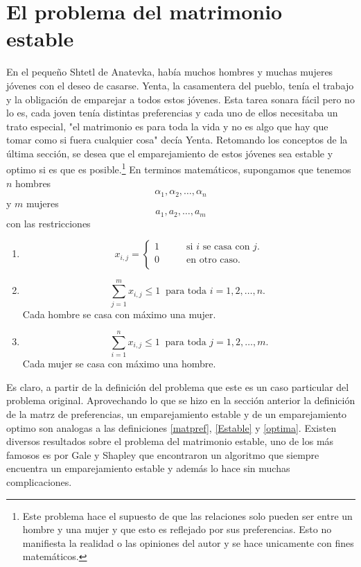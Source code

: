 \section{El problema del matrimonio estable}
En el pequeño Shtetl de Anatevka, había muchos hombres y muchas mujeres jóvenes con el deseo de casarse. Yenta, la casamentera del pueblo, tenía el trabajo y la obligación de emparejar a todos estos jóvenes. Esta tarea sonara fácil pero no lo es, cada joven tenía distintas preferencias y cada uno de ellos necesitaba un trato especial, "el matrimonio es para toda la vida y no es algo que hay que tomar como si fuera cualquier cosa" decía Yenta. Retomando los conceptos de la última sección, se desea que el emparejamiento de estos jóvenes sea estable y optimo si es que es posible.\footnote{Este problema hace el supuesto de que las relaciones solo pueden ser entre un hombre y una mujer y que esto es reflejado por sus preferencias. Esto no manifiesta la realidad o las opiniones del autor y se hace unicamente con fines matemáticos.}
En terminos matemáticos, supongamos que tenemos $n$ hombres $$\alpha_1,\alpha_2,\ldots,\alpha_n$$ y $m$ mujeres $$a_1, a_2,\ldots,a_m$$ con las restricciones
\begin{enumerate}
\item \begin{equation} \label{1r1}
x_{i,j}= 
\begin{cases}
1 & \qquad \text{si $i$ se casa con $j$.} \\
0 &\qquad\text{en otro caso.}\ \\ 
\end{cases} \end{equation}
\item \begin{equation} \label{1r2}
\sum_{j=1}^{m}x_{i,j} \leq1 \ \text{ para toda $i=1,2,\ldots,n$. }
\end{equation} Cada hombre se casa con máximo una mujer. 
\item \begin{equation} \label{1r3}
\sum_{i=1}^{n} x_{i,j} \leq 1\ \text{ para toda $j=1,2,\dots,m$.} 
\end{equation}
Cada mujer se casa con máximo una hombre. 
\end{enumerate}

Es claro, a partir de la definición del problema que este es un caso particular del problema original. Aprovechando lo que se hizo en la sección anterior la definición de la matrz de preferencias, un emparejamiento estable y de un emparejamiento optimo son analogas a las definiciones \ref{matpref}, \ref{Estable} y \ref{optima}. Existen diversos resultados sobre el problema del matrimonio estable, uno de los más famosos es por Gale y Shapley que encontraron un algoritmo que siempre encuentra un emparejamiento estable y además lo hace sin muchas complicaciones. 

